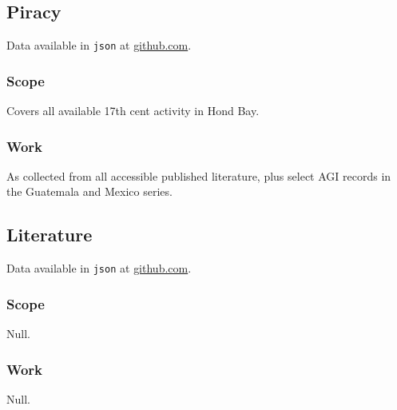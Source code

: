 \documentclass{amsart}
\newcommand{\code}[1]{\texttt{#1}}%
\theoremstyle{definition}%
\theoremstyle{definition}%
\begin{document}
\subsection{Piracy}%
\label{ss:piracy}
Data available in \code{json} at \href{http://github.com/aenavidad/pp-0}{github.com}.
\subsubsection{Scope} Covers all available 17th cent activity in Hond Bay.
\subsubsection{Work} As collected from all accessible published literature, plus select AGI records in the Guatemala and Mexico series.
%
\subsection{Literature}%
\label{ss:literature}
Data available in \code{json} at \href{http://github.com/aenavidad/pp-0}{github.com}.
\subsubsection{Scope} Null.
\subsubsection{Work} Null.
%
%
\begin{bibdiv}
\begin{biblist}
%
%
\end{biblist}
\end{bibdiv}
%
%
%
%
\end{document}
